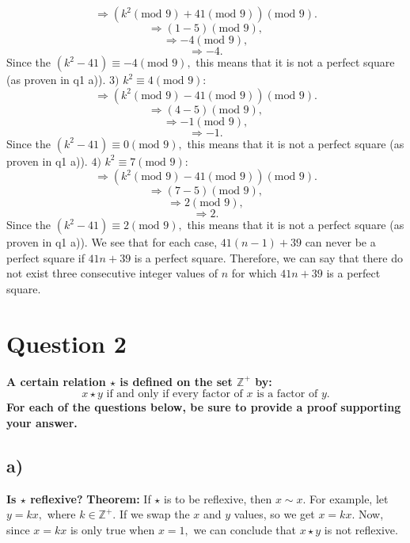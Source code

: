 \documentclass{article}
\begin{document}
$$\Rightarrow (k^2 (\text{mod } 9) + 41 (\text{mod } 9)) (\text{mod } 9).$$
$$\Rightarrow (1 - 5) (\text{mod } 9),$$
$$\Rightarrow -4 (\text{mod } 9),$$
$$\Rightarrow -4.$$
Since the $(k^2 - 41) \equiv -4 (\text{mod } 9),$ this means that it is not a perfect square (as proven in q1 a)).
\newline
$3) $ $k^2 \equiv 4 (\text{mod } 9)$:
\newline
\newline
$$\Rightarrow (k^2 (\text{mod } 9) - 41 (\text{mod } 9)) (\text{mod } 9).$$
$$\Rightarrow (4 - 5) (\text{mod } 9),$$
$$\Rightarrow -1 (\text{mod } 9),$$
$$\Rightarrow -1.$$
Since the $(k^2 - 41) \equiv 0 (\text{mod } 9),$ this means that it is not a perfect square (as proven in q1 a)).
\newline
$4) $ $k^2 \equiv 7 (\text{mod } 9)$:
\newline
\newline
$$\Rightarrow (k^2 (\text{mod } 9) - 41 (\text{mod } 9)) (\text{mod } 9).$$
$$\Rightarrow (7 - 5) (\text{mod } 9),$$
$$\Rightarrow 2 (\text{mod } 9),$$
$$\Rightarrow 2.$$
Since the $(k^2 - 41) \equiv 2 (\text{mod } 9),$ this means that it is not a perfect square (as proven in q1 a)).
\newline
We see that for each case, $41(n - 1) + 39$ can never be a perfect square if $41n + 39$ is a perfect square.
\newline
\newline
Therefore, we can say that there do not exist three consecutive integer values of $n$ for which $41n + 39$ is a perfect square.
\newpage
\section{Question 2}
\textbf{ A certain relation $\star$ is defined on the set $\mathbb{Z}^+$ by:
\newline
$$x \star y \text{ if and only if every factor of } x \text{ is a factor of } y.$$
For each of the questions below, be sure to provide a proof supporting your answer. }
\subsection{a)}
\textbf{ Is $\star $ reflexive? }
\newline
\newline
\textbf{Theorem: } If $\star$ is to be reflexive, then $x \sim x.$
\newline
For example, let $y = kx,$ where $k \in \mathbb{Z}^+.$
If we swap the $x$ and $y$ values, so we get $x = kx$. Now, since $x = kx$ is only true when $x = 1,$ we can conclude that $x \star y$ is not reflexive.
\newline
{}
\newpage
\end{document}
